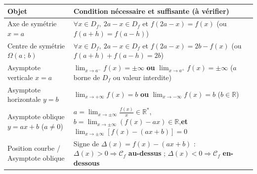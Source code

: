 \documentclass[11pt]{article}
\begin{document}
\begin{propriete}
\begin{center}
\begin{tabularx}{\linewidth}{|l|X|}
\hline
\rowcolor{popblueL} \textbf{Objet} & \textbf{Condition nécessaire et suffisante (à vérifier)} \\
\hline
Axe de symétrie $x=a$ & $\forall x\in D_f,\ 2a-x\in D_f$ et $f(2a-x)=f(x)$ \quad (ou $f(a+h)=f(a-h)$) \\
\hline
Centre de symétrie $\Omega(a\,;\,b)$ & $\forall x\in D_f,\ 2a-x\in D_f$ et $f(2a-x)=2b-f(x)$ \quad (ou $f(a+h)+f(a-h)=2b$) \\
\hline
Asymptote verticale $x=a$ & $\lim_{x\to a^-}f(x)=\pm\infty$ \textbf{ou} $\lim_{x\to a^+}f(x)=\pm\infty$ ($a$ borne de $D_f$ ou valeur interdite) \\
\hline
Asymptote horizontale $y=b$ & $\lim_{x\to +\infty}f(x)=b$ \textbf{ou} $\lim_{x\to -\infty}f(x)=b$ ($b\in\mathbb{R}$) \\
\hline
Asymptote oblique $y=ax+b$ ($a\neq0$) & $a=\lim_{x\to\pm\infty}\frac{f(x)}{x} \in \mathbb{R}^*$,\quad $b=\lim_{x\to\pm\infty}(f(x)-ax) \in \mathbb{R}$,\quad \textbf{et} $\lim_{x\to\pm\infty}[f(x)-(ax+b)]=0$ \\
\hline
Position courbe / Asymptote oblique & Signe de $\Delta(x)=f(x)-(ax+b)$ : $\Delta(x)>0 \Rightarrow \mathcal{C}_f$ \textbf{au-dessus} ; $\Delta(x)<0 \Rightarrow \mathcal{C}_f$ \textbf{en-dessous} \\
\hline
\end{tabularx}
\end{center}
\end{propriete}
\end{document}
